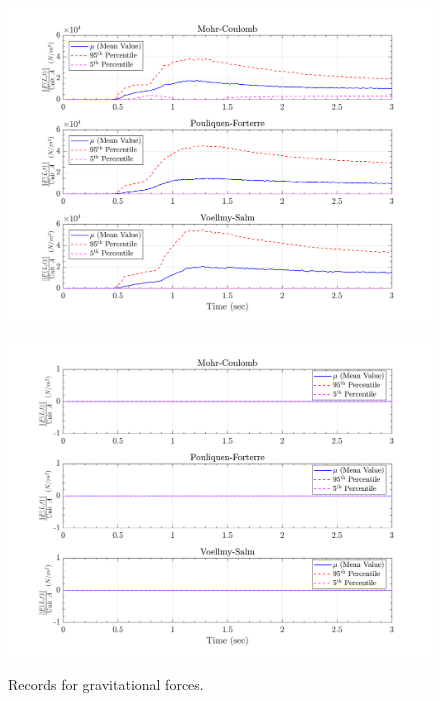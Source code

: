 \documentclass{article}
\begin{document}
\begin{figure}[H]
	\begin{minipage}[b]{0.5\linewidth}
    	\centering
    	\includegraphics[width=1\textwidth]{InclinedPlane/LocalRecords/Records/Fg_L15.png}
    	\label{fig:Ramp-L3-Fg}
	\end{minipage}
	\begin{minipage}[b]{0.5\linewidth}
		\centering
		\includegraphics[width=1\textwidth]{InclinedPlane/LocalRecords/Records/Fg_L17.png}
    	\label{fig:Ramp-L4-Fg}
    \end{minipage}
    \caption{Records for gravitational forces.}
    \label{fig:Ramp-LM-Fg}
\end{figure}
\end{document}
